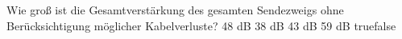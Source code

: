     {Wie groß ist die Gesamtverstärkung des gesamten Sendezweigs ohne Berücksichtigung möglicher Kabelverluste?}
    {48 dB}
    {38 dB}
    {43 dB}
    {59 dB}
    {true}{false}